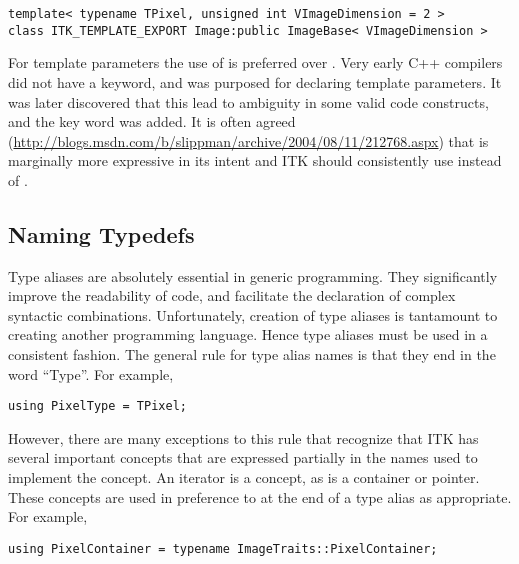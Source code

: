 \small
\begin{verbatim}
template< typename TPixel, unsigned int VImageDimension = 2 >
class ITK_TEMPLATE_EXPORT Image:public ImageBase< VImageDimension >
\end{verbatim}
\normalsize

For template parameters the use of  is preferred over
. Very early C++ compilers did not have a  keyword,
and  was purposed for declaring template parameters. It was later
discovered that this lead to ambiguity in some valid code constructs, and the
 key word was added. It is often agreed
(\href{http://blogs.msdn.com/b/slippman/archive/2004/08/11/212768.aspx}
{http://blogs.msdn.com/b/slippman/archive/2004/08/11/212768.aspx}) that
 is marginally more expressive in its intent and ITK should
consistently use  instead of .


\subsection{Naming Typedefs}
\label{subsec:NamingTypedefs}

Type aliases are absolutely essential in generic programming. They significantly
improve the readability of code, and facilitate the declaration of complex
syntactic combinations. Unfortunately, creation of type aliases is tantamount to
creating another programming language. Hence type aliases must be used in a
consistent fashion. The general rule for type alias names is that they end in the
word ``Type''. For example,

\small
\begin{verbatim}
using PixelType = TPixel;
\end{verbatim}
\normalsize

However, there are many exceptions to this rule that recognize that ITK has
several important concepts that are expressed partially in the names used to
implement the concept. An iterator is a concept, as is a container or pointer.
These concepts are used in preference to  at the end of a type alias as
appropriate. For example,

\small
\begin{verbatim}
using PixelContainer = typename ImageTraits::PixelContainer;
\end{verbatim}
\normalsize

